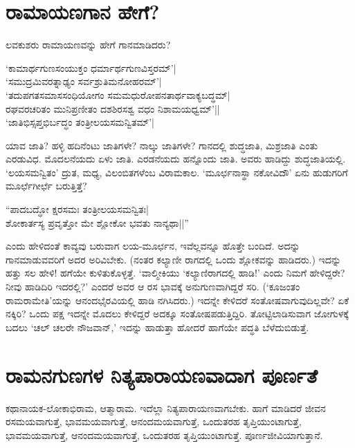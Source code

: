\section*{ರಾಮಾಯಣಗಾನ ಹೇಗೆ?}

ಲವಕುಶರು ರಾಮಾಯಣವನ್ನು ಹೇಗೆ ಗಾನಮಾಡಿದರು?

\begin{shloka}
`ಕಾಮಾರ್ಥಗುಣಸಂಯುಕ್ತಂ ಧರ್ಮಾರ್ಥಗುಣವಿಸ್ತರಮ್'|\label{212}\\
`ಸಮುದ್ರಮಿವರತ್ನಾಢ್ಯಂ ಸರ್ವಶ್ರುತಿಮನೋಹರಮ್'|\\
`ತದುಪಗತಸಮಾಸಸಂಧಿಯೋಗಂ ಸಮಮಧುರೋಪನತಾರ್ಥವಾಕ್ಯಬದ್ಧಮ್|\\
ರಘವರಚರಿತಂ ಮುನಿಪ್ರಣೀತಂ ದಶಶಿರಸಶ್ವ ವಧಂ ನಿಶಾಮಯಧ್ವಮ್'||\\
`ಜಾತಿಭಿಸ್ಸಪ್ತಭಿರ್ಬದ್ಧಂ ತಂತ್ರೀಲಯಸಮನ್ವಿತಮ್'|
\end{shloka}

ಯಾವ ಜಾತಿ? ಹಳ್ಳಿ ಹದಿನೆಂಟು ಜಾತಿಗಳೇ? ನಾಲ್ಕು ಜಾತಿಗಳೇ? ಗಾನದಲ್ಲಿ ಶುದ್ಧಜಾತಿ, ಮಿಶ್ರಜಾತಿ ಎಂತು ಎರಡುವಿಧ. ಮೊದಲನೆಯದು ಏಳು ಜಾತಿ. ಎರಡನೆಯದು ಹನ್ನೊಂದು ಜಾತಿ. ಅವರು ಹಾಡಿದ್ದು ಶುದ್ಧಜಾತಿಯಲ್ಲಿ. `ಲಯಸಮನ್ವಿತಂ' ದ್ರುತ, ಮಧ್ಯ, ವಿಲಂಬಿತಗಳೆಂಬ ವಿರಾಮಕಾಲ. `ಮೂರ್ಛನಾಸ್ಥಾ ನಕೋವಿದೌ' ಏನು ಹುಡುಗರಿಗೆ ಮೂರ್ಛೆಗೀರ್ಛೆ ಬರುತ್ತಿತ್ತೆ? 

\begin{shloka}
``ಪಾದಬದ್ಧೋ ಕ್ಷರಸಮಃ ತಂತ್ರೀಲಯಸಮನ್ವಿತಃ|\label{213}\\
ಶೋಕಾರ್ತಸ್ಯ ಪ್ರವೃತ್ತೋ ಮೇ ಶ್ಲೋಕೋ ಭವತು ನಾನ್ಯಥಾ||''
\end{shloka}

ಎಂದು ಹೇಳಿದಂತೆ ಕಾವ್ಯವು ಬರುವಾಗ ಲಯ-ಮೂರ್ಛನ, ಇವೆಲ್ಲವನ್ನೂ ಹೊತ್ತೇ ಬಂದಿದೆ. ಅದನ್ನು ಗಾನಮಾಡುವವರಿಗೆ  ಅದರ ಅರಿವಿಬೇಕು. (ನಂತರ ಕಲ್ಯಾಣೀ ರಾಗದಲ್ಲಿ ಒಂದು ಶ್ಲೋಕವನ್ನು ಹಾಡಿದರು.) ಇದನ್ನು ಹತ್ತು ಸಲ ಹೇಳಿ! ಹಗೆಯೇ ಕುಳಿತುಕೊಳ್ಳತ್ತೆ. `ವಾಲ್ಮೀಕಿಯು `ಕಲ್ಯಾಣಿರಾಗದಲ್ಲಿ ಹಾಡಿ!' ಎಂದು ನಿಮಗೆ ಹೇಳಿದ್ದರೇ? ನೀವು ಹಾಡಿದಿರಿ ಇದರಲ್ಲಿ?' ಎಂದರೆ ಅವರ ಆ ರಸ ಭಾವಕ್ಕೆ ಅನುಗುಣವಾಗಿದ್ದರೆ ಸರಿ. (`ಕೂಜಂತಂ ರಾಮರಾಮೇತಿ'ಯನ್ನು ಆನಂದಭೈರವಿಯಲ್ಲಿ ಹಾಡಿ ನಗಿಸಿದರು.) ಇದನ್ನೇ ಕೇಳಿದರೆ ಸಂತೋಷವಾಗುವುದಿಲ್ಲವೇ? ಏಕೆ ನಕ್ಕಿರಿ? ಒಂದು ಪಕ್ಷ ಇದನ್ನೇ ಮೊದಲು ಕೇಳಿದ್ದರೆ ಅದಕ್ಕೂ ಸಂತೋಷಪಡುತ್ತಿದ್ದಿರಿ. ತೋಟ್ಟಿಲಾಡಿಸುವಾಗ ಜೋಗುಳಕ್ಕೆ  ಬದಲು `ಚಲ್ ಚಲರೇ ನೌಜವಾನ್,' ಇದನ್ನು ಹಾಡುತ್ತಾ ಹೋದರೆ ಹಾಗೆಯೇ ಪದ್ಧತಿ ಬೆಳೆದುಬಿಡುತ್ತೆ. 

\section*{ರಾಮನಗುಣಗಳ ನಿತ್ಯಪಾರಾಯಣವಾದಾಗ ಪೂರ್ಣತೆ}

ಕಥಾನಾಯಕ-ಲೋಕಾಭಿರಾಮ, ಆತ್ಮಾರಾಮ. ಇದೆಲ್ಲಾ ನಿತ್ಯಪಾರಾಯಣವಾಗಬೇಕು. ಹಾಗೆ ಮಾಡಿದರೆ ಜೀವನ ರಸಮಯವಾಗುತ್ತೆ, ಭಾವಮಯವಾಗುತ್ತೆ, ಆನಂದಮಯವಾಗುತ್ತೆ, ಒಂದುತರಹ ತೃಪ್ತಿಯುಂಟಾಗುತ್ತೆ, ಭಾವಮಯವಾಗುತ್ತೆ, ಆನಂದಮಯವಾಗುತ್ತೆ, ಒಂದುತರಹ ತೃಪ್ತಿಯುಂಟಾಗುತ್ತೆ. ಪೂರ್ಣಜೀವಿಯಾಗುತ್ತಾನೆ. 

